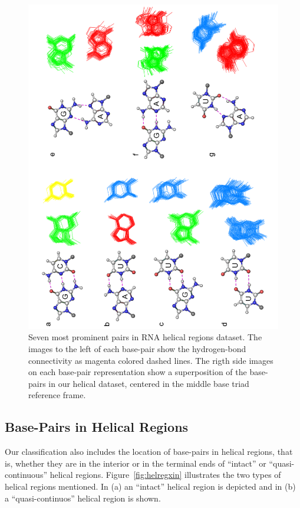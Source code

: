\begin{figure}[htbp]
\centering
\includegraphics[angle=-90, scale=0.6]{Chapter3/sevenpairs.png}
\caption{Seven   most   prominent  pairs   in   RNA  helical   regions
  dataset.  The  images  to  the  left  of  each  base-pair  show  the
  hydrogen-bond  connectivity  as magenta  colored  dashed lines.  The
  rigth  side   images  on   each  base-pair  representation   show  a
  superposition of the base-pairs  in our helical dataset, centered in
  the middle base triad reference frame. }
\label{fig:pairs}
\end{figure}

\subsection{Base-Pairs in Helical Regions}
Our classification also includes the location of base-pairs in helical
regions, that is, whether they are  in the interior or in the terminal
ends     of     ``intact''     or     ``quasi-continuous''     helical
regions.  Figure~\ref{fig:helregxin}  illustrates  the  two  types  of
helical regions  mentioned. In (a) an  ``intact'' helical region
is depicted and in (b) a ``quasi-continuos'' helical region is shown.


